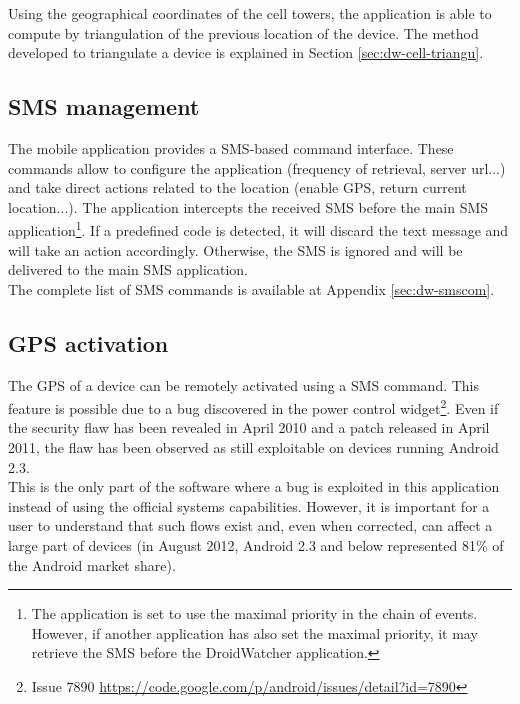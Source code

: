 Using the geographical coordinates of the cell towers, the application is able to compute by triangulation of the previous location of the device.
The method developed to triangulate a device is explained in Section \ref{sec:dw-cell-triangu}.

\subsection{SMS management}
\label{sec:dw-sms-manag}

The mobile application provides a SMS-based command interface.
These commands allow to configure the application (frequency of retrieval, server url...) and take direct actions related to the location (enable GPS, return current location...).
The application intercepts the received SMS before the main SMS application\footnote{The application is set to use the maximal priority in the chain of events. However, if another application has also set the maximal priority, it may retrieve the SMS before the DroidWatcher application.}.
If a predefined code is detected, it will discard the text message and will take an action accordingly.
Otherwise, the SMS is ignored and will be delivered to the main SMS application.\\

The complete list of SMS commands is available at Appendix \ref{sec:dw-smscom}.

\subsection{GPS activation}
\label{sec:dw-gps-bug}

The GPS of a device can be remotely activated using a SMS command.
This feature is possible due to a bug discovered in the power control widget\footnote{Issue 7890 \url{https://code.google.com/p/android/issues/detail?id=7890}}.
Even if the security flaw has been revealed in April 2010 and a patch released in April 2011, the flaw has been observed as still exploitable on devices running Android 2.3.\\

This is the only part of the software where a bug is exploited in this application instead of using the official systems capabilities.
However, it is important for a user to understand that such flows exist and, even when corrected, can affect a large part of devices (in August 2012, Android 2.3 and below represented 81\% of the Android market share).


